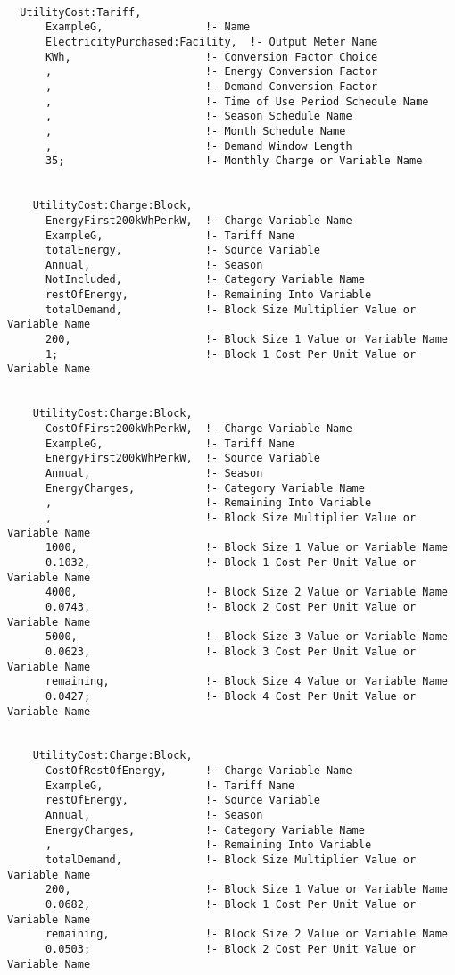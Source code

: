 \begin{lstlisting}

  UtilityCost:Tariff,
      ExampleG,                !- Name
      ElectricityPurchased:Facility,  !- Output Meter Name
      KWh,                     !- Conversion Factor Choice
      ,                        !- Energy Conversion Factor
      ,                        !- Demand Conversion Factor
      ,                        !- Time of Use Period Schedule Name
      ,                        !- Season Schedule Name
      ,                        !- Month Schedule Name
      ,                        !- Demand Window Length
      35;                      !- Monthly Charge or Variable Name


    UtilityCost:Charge:Block,
      EnergyFirst200kWhPerkW,  !- Charge Variable Name
      ExampleG,                !- Tariff Name
      totalEnergy,             !- Source Variable
      Annual,                  !- Season
      NotIncluded,             !- Category Variable Name
      restOfEnergy,            !- Remaining Into Variable
      totalDemand,             !- Block Size Multiplier Value or Variable Name
      200,                     !- Block Size 1 Value or Variable Name
      1;                       !- Block 1 Cost Per Unit Value or Variable Name


    UtilityCost:Charge:Block,
      CostOfFirst200kWhPerkW,  !- Charge Variable Name
      ExampleG,                !- Tariff Name
      EnergyFirst200kWhPerkW,  !- Source Variable
      Annual,                  !- Season
      EnergyCharges,           !- Category Variable Name
      ,                        !- Remaining Into Variable
      ,                        !- Block Size Multiplier Value or Variable Name
      1000,                    !- Block Size 1 Value or Variable Name
      0.1032,                  !- Block 1 Cost Per Unit Value or Variable Name
      4000,                    !- Block Size 2 Value or Variable Name
      0.0743,                  !- Block 2 Cost Per Unit Value or Variable Name
      5000,                    !- Block Size 3 Value or Variable Name
      0.0623,                  !- Block 3 Cost Per Unit Value or Variable Name
      remaining,               !- Block Size 4 Value or Variable Name
      0.0427;                  !- Block 4 Cost Per Unit Value or Variable Name


    UtilityCost:Charge:Block,
      CostOfRestOfEnergy,      !- Charge Variable Name
      ExampleG,                !- Tariff Name
      restOfEnergy,            !- Source Variable
      Annual,                  !- Season
      EnergyCharges,           !- Category Variable Name
      ,                        !- Remaining Into Variable
      totalDemand,             !- Block Size Multiplier Value or Variable Name
      200,                     !- Block Size 1 Value or Variable Name
      0.0682,                  !- Block 1 Cost Per Unit Value or Variable Name
      remaining,               !- Block Size 2 Value or Variable Name
      0.0503;                  !- Block 2 Cost Per Unit Value or Variable Name
\end{lstlisting}

